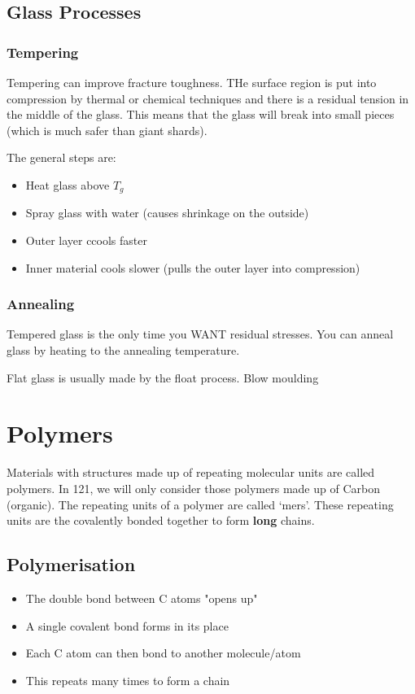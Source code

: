 \documentclass[12pt]{article}
\begin{document}
\subsection{Glass Processes} 
\subsubsection{Tempering}
Tempering can improve fracture toughness.
THe surface region is put into compression by thermal or chemical techniques and there is a residual tension in the middle of the glass.
This means that the glass will break into small pieces (which is much safer than giant shards).

The general steps are:
\begin{itemize}
  \item Heat glass above $T_g$
  \item Spray glass with water (causes shrinkage on the outside)
  \item Outer layer ccools faster
  \item Inner material cools slower (pulls the outer layer into compression)
\end{itemize}

\subsubsection{Annealing}
Tempered glass is the only time you WANT residual stresses.
You can anneal glass by heating to the annealing temperature. 

Flat glass is usually made by the float process. 
Blow moulding 

\section{Polymers}
Materials with structures made up of repeating molecular units are called polymers.
In 121, we will only consider those polymers made up of Carbon (organic).
The repeating units of a polymer are called `mers'. 
These repeating units are the covalently bonded together to form \textbf{long} chains.

\subsection{Polymerisation}
\begin{itemize}
  \item The double bond between C atoms "opens up"
  \item A single covalent bond forms in its place 
  \item Each C atom can then bond to another molecule/atom
  \item This repeats many times to form a chain
\end{itemize}
\end{document}
